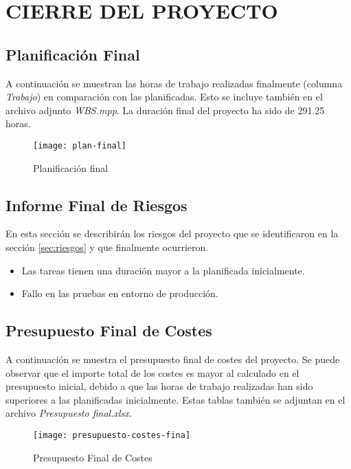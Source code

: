 \newpage
\section{CIERRE DEL PROYECTO}

\subsection{Planificación Final}
A continuación se muestran las horas de trabajo realizadas finalmente (columna \textit{Trabajo}) en comparación con las planificadas. Esto se incluye también en el archivo adjunto \textit{WBS.mpp}. La duración final del proyecto ha sido de 291.25 horas.
\newpage
\pagestyle{empty}
\begin{figure}[H]
\vspace{-25mm}
\centering
\centerline{\texttt{[image: plan-final]}}
\caption{Planificación final}
\end{figure} 
\newpage
\pagestyle{fancy}
\subsection{Informe Final de Riesgos}
En esta sección se describirán los riesgos del proyecto que se identificaron en la sección \ref{sec:riesgos} y que finalmente ocurrieron.
\begin{itemize}
\item Las tareas tienen una duración mayor a la planificada inicialmente.
\item Fallo en las pruebas en entorno de producción.
\end{itemize}
\subsection{Presupuesto Final de Costes}
A continuación se muestra el presupuesto final de costes del proyecto. Se puede observar que el importe total de los costes es mayor al calculado en el presupuesto inicial, debido a que las horas de trabajo realizadas han sido superiores a las planificadas inicialmente. Estas tablas también se adjuntan en el archivo \textit{Presupuesto final.xlsx}.
\begin{figure}[H]
\centering
\centerline{\texttt{[image: presupuesto-costes-fina]}}
\caption{Presupuesto Final de Costes}
\end{figure} 


